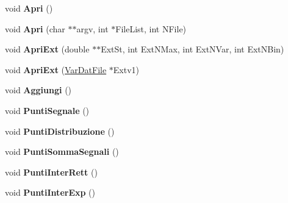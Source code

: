 \begin{DoxyCompactItemize}
\item 
\hypertarget{classElementiGrafici_a7ce426fbebfb112e79be160c5dabb7a8}{void {\bfseries \-Apri} ()}\label{classElementiGrafici_a7ce426fbebfb112e79be160c5dabb7a8}

\item 
\hypertarget{classElementiGrafici_a348285e35871cf0c33b78e99ada91daf}{void {\bfseries \-Apri} (char $\ast$$\ast$argv, int $\ast$\-File\-List, int \-N\-File)}\label{classElementiGrafici_a348285e35871cf0c33b78e99ada91daf}

\item 
\hypertarget{classElementiGrafici_afd8f1c7dfdb7c0e0ce1e58abe4c10491}{void {\bfseries \-Apri\-Ext} (double $\ast$$\ast$\-Ext\-St, int \-Ext\-N\-Max, int \-Ext\-N\-Var, int \-Ext\-N\-Bin)}\label{classElementiGrafici_afd8f1c7dfdb7c0e0ce1e58abe4c10491}

\item 
\hypertarget{classElementiGrafici_a7e686314b411f0ea6c67d7ae048829ff}{void {\bfseries \-Apri\-Ext} (\hyperlink{classVarDatFile}{\-Var\-Dat\-File} $\ast$\-Extv1)}\label{classElementiGrafici_a7e686314b411f0ea6c67d7ae048829ff}

\item 
\hypertarget{classElementiGrafici_ae5ca66a932311e9241fd5a19bcb71df9}{void {\bfseries \-Aggiungi} ()}\label{classElementiGrafici_ae5ca66a932311e9241fd5a19bcb71df9}

\item 
\hypertarget{classElementiGrafici_a19020236a1891d63ef61683900a14339}{void {\bfseries \-Punti\-Segnale} ()}\label{classElementiGrafici_a19020236a1891d63ef61683900a14339}

\item 
\hypertarget{classElementiGrafici_a8173ea1c5803ffb3d49d519c6ba6bd62}{void {\bfseries \-Punti\-Distribuzione} ()}\label{classElementiGrafici_a8173ea1c5803ffb3d49d519c6ba6bd62}

\item 
\hypertarget{classElementiGrafici_a7d0091b09fc90defa5dc08753c6f7548}{void {\bfseries \-Punti\-Somma\-Segnali} ()}\label{classElementiGrafici_a7d0091b09fc90defa5dc08753c6f7548}

\item 
\hypertarget{classElementiGrafici_a0bf5647190e07ca5bdc66479b68a83dc}{void {\bfseries \-Punti\-Inter\-Rett} ()}\label{classElementiGrafici_a0bf5647190e07ca5bdc66479b68a83dc}

\item 
\hypertarget{classElementiGrafici_a2c1948aa11cce55281310900e1605104}{void {\bfseries \-Punti\-Inter\-Exp} ()}\label{classElementiGrafici_a2c1948aa11cce55281310900e1605104}


\end{DoxyCompactItemize}
